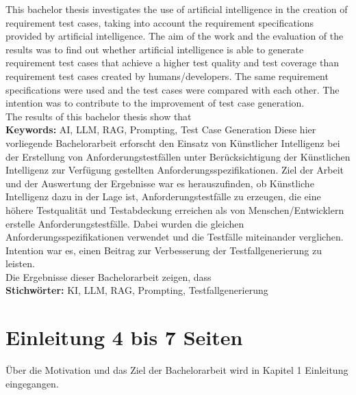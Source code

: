 \documentclass[12pt,toc=bib,toc=listof]{scrreprt}
\begin{document}
\label{sec:abstract}
This bachelor thesis investigates the use of artificial intelligence in the creation of requirement test cases, taking into account the requirement specifications provided by artificial intelligence. The aim of the work and the evaluation of the results was to find out whether artificial intelligence is able to generate requirement test cases that achieve a higher test quality and test coverage than requirement test cases created by humans/developers. The same requirement specifications were used and the test cases were compared with each other. The intention was to contribute to the improvement of test case generation.\\
The results of this bachelor thesis show that
\\
\textbf{Keywords:} AI, LLM, RAG, Prompting, Test Case Generation
\newpage
{} %
\label{sec:zusammenfassung}
Diese hier vorliegende Bachelorarbeit erforscht den Einsatz von Künstlicher Intelligenz bei der Erstellung von Anforderungstestfällen unter Berücksichtigung der Künstlichen Intelligenz zur Verfügung gestellten Anforderungsspezifikationen. Ziel der Arbeit und der Auswertung der Ergebnisse war es herauszufinden, ob Künstliche Intelligenz dazu in der Lage ist, Anforderungstestfälle zu erzeugen, die eine höhere Testqualität und Testabdeckung erreichen als von Menschen/Entwicklern erstelle Anforderungstestfälle. Dabei wurden die gleichen Anforderungsspezifikationen verwendet und die Testfälle miteinander verglichen. Intention war es, einen Beitrag zur Verbesserung der Testfallgenerierung zu leisten.\\
Die Ergebnisse dieser Bachelorarbeit zeigen, dass
\\
\textbf{Stichwörter:} KI, LLM, RAG, Prompting, Testfallgenerierung

\newpage
{}

\chapter{Einleitung 4 bis 7 Seiten} %
\label{sec:einleitung}
Über die Motivation und das Ziel der Bachelorarbeit wird in Kapitel 1 Einleitung eingegangen.\\
\end{document}

